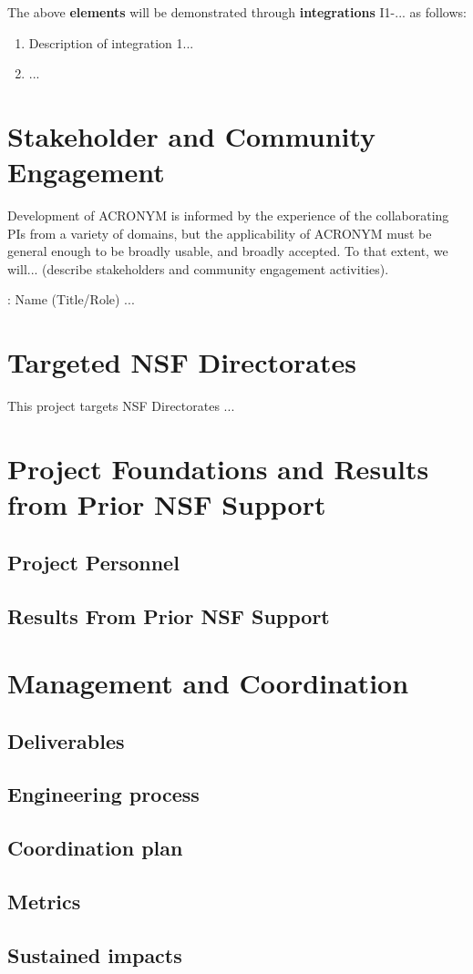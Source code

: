 The above {\bf elements} will be demonstrated through {\bf integrations} I1-... as follows: 
\begin{enumerate}[label={\bf I\arabic*.},start=1]
\item Description of integration 1...
\item ...
\end{enumerate}

\section{Stakeholder and Community Engagement}

Development of ACRONYM is informed by the experience of the collaborating PIs from a variety of domains, but the applicability of ACRONYM must be general enough to be broadly usable, and broadly accepted. To that extent, we will... (describe stakeholders and community engagement activities).

: Name (Title/Role) ...

\section{Targeted NSF Directorates}
This project targets NSF Directorates ...

\section{Project Foundations and Results from Prior NSF Support}

\subsection*{Project Personnel}

\subsection*{Results From Prior NSF Support}

\section{Management and Coordination}

\subsection*{Deliverables}

\subsection*{Engineering process}

\subsection*{Coordination plan}

\subsection*{Metrics}

\subsection*{Sustained impacts}

